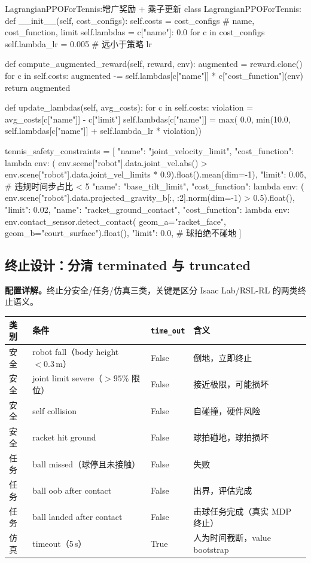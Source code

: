\begin{codebox}[Python]{LagrangianPPOForTennis:增广奖励 + 乘子更新}
class LagrangianPPOForTennis:
    def __init__(self, cost_configs):
        self.costs = cost_configs                       # name, cost_function, limit
        self.lambdas = {c["name"]: 0.0 for c in cost_configs}
        self.lambda_lr = 0.005                          # 远小于策略 lr

    def compute_augmented_reward(self, reward, env):
        augmented = reward.clone()
        for c in self.costs:
            augmented -= self.lambdas[c["name"]] * c["cost_function"](env)
        return augmented

    def update_lambdas(self, avg_costs):
        for c in self.costs:
            violation = avg_costs[c["name"]] - c["limit"]
            self.lambdas[c["name"]] = max(
                0.0, min(10.0, self.lambdas[c["name"]] + self.lambda_lr * violation))

tennis_safety_constraints = [
    {"name": "joint_velocity_limit",
     "cost_function": lambda env: (
         env.scene["robot"].data.joint_vel.abs()
         > env.scene["robot"].data.joint_vel_limits * 0.9).float().mean(dim=-1),
     "limit": 0.05},   # 违规时间步占比 < 5%
    {"name": "base_tilt_limit",
     "cost_function": lambda env: (
         env.scene["robot"].data.projected_gravity_b[:, :2].norm(dim=-1) > 0.5).float(),
     "limit": 0.02},
    {"name": "racket_ground_contact",
     "cost_function": lambda env: env.contact_sensor.detect_contact(
         geom_a="racket_face", geom_b="court_surface").float(),
     "limit": 0.0},    # 球拍绝不碰地
]
\end{codebox}

\subsection{终止设计：分清 terminated 与 truncated}

\textbf{配置详解。}终止分安全/任务/仿真三类，关键是区分 Isaac Lab/RSL-RL 的两类终止语义。

\begin{center}
\small
\begin{tabular}{@{}llll@{}}
\toprule
类别 & 条件 & \verb|time_out| & 含义 \\
\midrule
安全 & robot fall（body height $<0.3$\,m） & False & 倒地，立即终止 \\
安全 & joint limit severe（$>95\%$ 限位） & False & 接近极限，可能损坏 \\
安全 & self collision & False & 自碰撞，硬件风险 \\
安全 & racket hit ground & False & 球拍碰地，球拍损坏 \\
任务 & ball missed（球停且未接触） & False & 失败 \\
任务 & ball oob after contact & False & 出界，评估完成 \\
任务 & ball landed after contact & False & 击球任务完成（真实 MDP 终止） \\
仿真 & timeout（5\,s） & True & 人为时间截断，value bootstrap \\
\bottomrule
\end{tabular}
\end{center}

